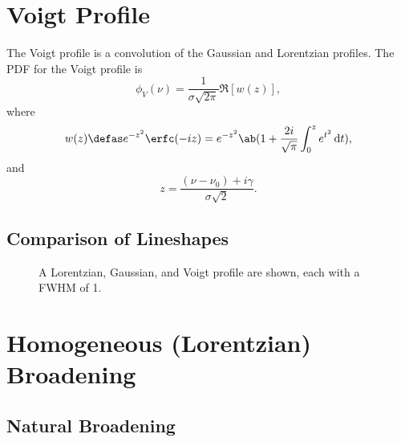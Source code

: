 \section{Voigt Profile}
\label{s:voigt_profile}

The Voigt profile is a convolution of the Gaussian and Lorentzian profiles.
The PDF for the Voigt profile is
\begin{equation*}
    \phi_V(\nu) = \frac{1}{\sigma\sqrt{2\pi}}\Re[w(z)],
\end{equation*}
where
\begin{equation*}
    w(z) \defas e^{-z^2}\erfc(-iz) = e^{-z^2}\ab(1 + \frac{2i}{\sqrt{\pi}}\int_0^z e^{t^2} \odif{t}),
\end{equation*}
and
\begin{equation*}
    z = \frac{(\nu - \nu_0) + i\gamma}{\sigma\sqrt{2}}.
\end{equation*}

\subsection{Comparison of Lineshapes}

\begin{figure}[H]
    \centering
    \caption{A Lorentzian, Gaussian, and Voigt profile are shown, each with a FWHM of 1.}
\end{figure}

\section{Homogeneous (Lorentzian) Broadening}

\subsection{Natural Broadening}

